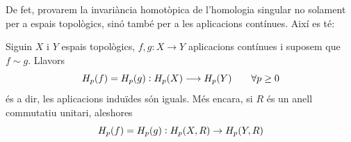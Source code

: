 \documentclass[../main.tex]{subfiles}
\begin{document}
De fet, provarem la invariància homotòpica de l'homologia singular no solament per a espais topològics, sinó també per a les aplicacions contínues. Així es té:

\begin{ter}
\label{ter:invarianciahomotopica} Siguin $X$ i $Y$ espais topològics, $f,g:X\rightarrow Y$ aplicacions contínues i suposem que $f\sim g$. Llavors
\begin{equation}
    \notag
    H_p(f) = H_p(g):H_p(X)\longrightarrow H_p(Y)\qquad \forall p\geq 0
\end{equation}
és a dir, les aplicacions induïdes són iguals. Més encara, si $R$ és un anell commutatiu unitari, aleshores
\begin{equation}
    \notag
    H_p(f) = H_p(g):H_p(X,R)\rightarrow H_p(Y,R)
\end{equation}
\end{ter}
\end{document}
